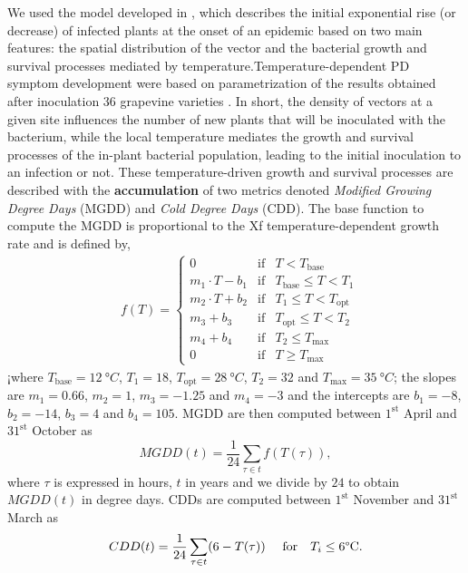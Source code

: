 We used the model developed in \cite{GimenezRomero2022_CommsBio}, which
describes
the initial exponential rise (or decrease) of infected plants at the onset of
an epidemic based on two main features: the spatial distribution of the vector
and the bacterial growth and survival processes mediated by
temperature.Temperature-dependent PD symptom development were based on
parametrization of the results obtained after inoculation 36 grapevine
varieties \cite{GimenezRomero2022_CommsBio}. In short, the density of vectors
at a
given site influences the number of new plants that will be inoculated with the
bacterium, while the local temperature mediates the growth and survival
processes of the in-plant bacterial population, leading to the initial
inoculation to an infection or not. These temperature-driven growth and
survival processes are described with the \textbf{accumulation} of two metrics
denoted \textit{Modified Growing Degree Days} (MGDD) and \textit{Cold Degree
    Days} (CDD). The base function to compute the MGDD is proportional to the
Xf
temperature-dependent growth rate and is defined by,
\begin{align*}
     & f(T)=\left\{\begin{array}{lll}
                       0                & \textrm{if} & T<T_{\textrm{base}}
                       \\
                       m_1\cdot T-b_1   & \textrm{if} & T_{\textrm{base}}
                       \leq T < T_1
                       \\
                       m_2\cdot T + b_2 & \textrm{if} & T_{1} \leq T <
                       T_{\textrm{opt}}
                       \\
                       m_3 + b_3        & \textrm{if} & T_{\textrm{opt}}
                       \leq T < T_2
                       \\
                       m_4 + b_4        & \textrm{if} & T_2 \leq
                       T_{\textrm{max}}
                       \\
                       0                & \textrm{if} & T\geq
                       T_{\textrm{max}}
                   \end{array}\right. \,
\end{align*}
¡where $T_{\textrm{base}}=\SI{12}{\degree C}$, $T_1=18$,
$T_{\textrm{opt}}=\SI{28}{\degree C}$,	$T_2=32$ and
$T_{\textrm{max}}=\SI{35}{\degree C}$; the slopes are $m_1= 0.66$, $m_2=1$,
$m_3=-1.25$ and $m_4=-3$ and the intercepts are $b_1=-8$, $b_2=-14$, $b_3=4$
and $b_4=105$. MGDD are then computed between $1^{\mathrm{st}}$ April and
$31^{\mathrm{st}}$ October as
\begin{equation}\label{eq:MGDD_def}
    MGDD(t) = \frac{1}{24}\sum_{\tau \in t} f(T(\tau)),
\end{equation}
where $\tau$ is expressed in hours, $t$ in years and we divide by $24$ to
obtain $MGDD(t)$ in degree days.
CDDs are computed between $1^{\mathrm{st}}$ November and $31^{\mathrm{st}}$
March as
\begin{equation}
    CDD(t)= \frac{1}{24}\sum_{\tau \in t} (6-T(\tau)) \ \quad \textrm{for}
    \quad T_i\le 6\textrm{\textdegree C} .
\end{equation}

